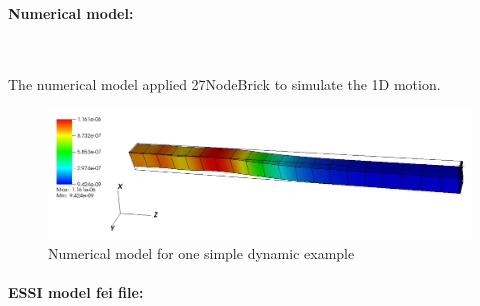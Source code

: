 \documentclass[fleqn,11pt]{article}
\begin{document}
\paragraph{Numerical model:} ~

The numerical model applied 27NodeBrick to simulate the 1D motion. 

\begin{figure}[!htb]
  \centering
  \includegraphics[width=16cm]{../Figure-files/_Chapter_Appendix_Illustrative_Examples/dynamic_example_numerical.pdf}
  \caption{Numerical model for one simple dynamic example}
  \label{fig Numerical model for one simple dynamic example}
\end{figure}

\paragraph{ESSI model fei file: } ~
\end{document}
